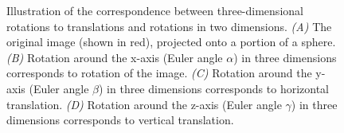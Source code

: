 \documentclass{pnastwo}
\begin{document}
\begin{figure}
\begin{minipage}{0.22\textwidth}
\end{minipage}
\caption{Illustration of the correspondence between three-dimensional rotations to translations and rotations in two dimensions. {\it (A)} The original image (shown in red), projected onto a portion of a sphere. {\it (B)} Rotation around the x-axis (Euler angle $\alpha$) in three dimensions corresponds to rotation of the image. {\it (C)} Rotation around the y-axis (Euler angle $\beta$) in three dimensions corresponds to horizontal translation. {\it (D)} Rotation around the z-axis (Euler angle $\gamma$) in three dimensions corresponds to vertical translation.}
\label{fig:SO3_picture}
\end{figure}

\begin{figure}
\end{figure}
\end{document}
